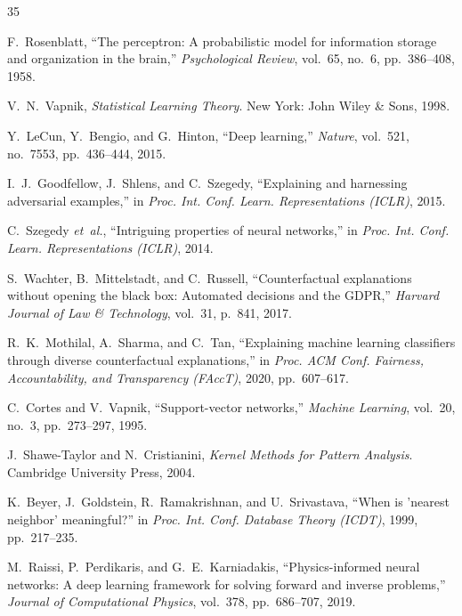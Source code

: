 \documentclass[journal,twoside]{IEEEtran}
\theoremstyle{remark}
\begin{document}
\begin{thebibliography}{35}

F.~Rosenblatt, ``The perceptron: A probabilistic model for information storage and organization in the brain,'' \emph{Psychological Review}, vol.~65, no.~6, pp.~386--408, 1958.

V.~N.~Vapnik, \emph{Statistical Learning Theory}. New York: John Wiley \& Sons, 1998.

Y.~LeCun, Y.~Bengio, and G.~Hinton, ``Deep learning,'' \emph{Nature}, vol.~521, no.~7553, pp.~436--444, 2015.

I.~J.~Goodfellow, J.~Shlens, and C.~Szegedy, ``Explaining and harnessing adversarial examples,'' in \emph{Proc. Int. Conf. Learn. Representations (ICLR)}, 2015.

C.~Szegedy \emph{et~al.}, ``Intriguing properties of neural networks,'' in \emph{Proc. Int. Conf. Learn. Representations (ICLR)}, 2014.

S.~Wachter, B.~Mittelstadt, and C.~Russell, ``Counterfactual explanations without opening the black box: Automated decisions and the GDPR,'' \emph{Harvard Journal of Law \& Technology}, vol.~31, p.~841, 2017.

R.~K.~Mothilal, A.~Sharma, and C.~Tan, ``Explaining machine learning classifiers through diverse counterfactual explanations,'' in \emph{Proc. ACM Conf. Fairness, Accountability, and Transparency (FAccT)}, 2020, pp.~607--617.

C.~Cortes and V.~Vapnik, ``Support-vector networks,'' \emph{Machine Learning}, vol.~20, no.~3, pp.~273--297, 1995.

J.~Shawe-Taylor and N.~Cristianini, \emph{Kernel Methods for Pattern Analysis}. Cambridge University Press, 2004.

K.~Beyer, J.~Goldstein, R.~Ramakrishnan, and U.~Srivastava, ``When is 'nearest neighbor' meaningful?'' in \emph{Proc. Int. Conf. Database Theory (ICDT)}, 1999, pp.~217--235.

M.~Raissi, P.~Perdikaris, and G.~E.~Karniadakis, ``Physics-informed neural networks: A deep learning framework for solving forward and inverse problems,'' \emph{Journal of Computational Physics}, vol.~378, pp.~686--707, 2019.


\end{thebibliography}
\end{document}
